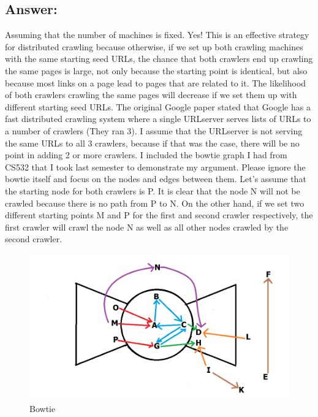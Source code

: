 \documentclass[a4paper, 11pt]{article}
\begin{document}
\subsection*{Answer:}
Assuming that the number of machines is fixed. Yes! This is an effective strategy for distributed crawling because otherwise, if we set up both crawling machines with the same starting seed URLs, the chance that both crawlers end up crawling the same pages is large, not only because the starting point is identical, but also because most links on a page lead to pages that are related to it. The likelihood of both crawlers crawling the same pages will decrease if we set them up with different starting seed URLs. The original Google paper stated that Google has a fast distributed crawling system where a single URLserver serves lists of URLs to a number of crawlers (They ran 3). I assume that the URLserver is not serving the same URLs to all 3 crawlers, because if that was the case, there will be no point in adding 2 or more crawlers. I included the bowtie graph I had from CS532 that I took last semester to demonstrate my argument. Please ignore the bowtie itself and focus on the nodes and edges between them. Let's assume that the starting node for both crawlers is P. It is clear that the node N will not be crawled because there is no path from P to N. On the other hand, if we set two different starting points M and P for the first and second crawler respectively, the first crawler will crawl the node N as well as all other nodes crawled by the second crawler.

\begin{figure}[h]
\caption{Bowtie}
\centering
\includegraphics[scale=0.5]{Q2/bowtie.png}
\end{figure}
\end{document}
